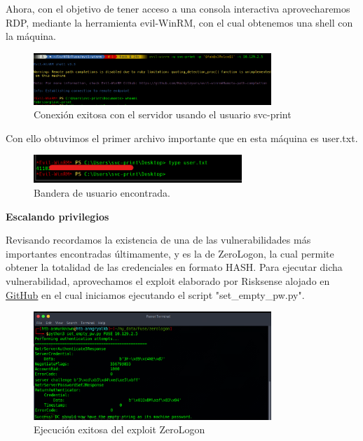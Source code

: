 \documentclass{article}
\begin{document}
Ahora, con el objetivo de tener acceso a una consola interactiva aprovecharemos RDP, mediante la herramienta evil-WinRM, con el cual obtenemos una shell con la máquina.

\begin{figure}[h]
	\center
	\includegraphics[width=0.8\textwidth]{images/fuse/image16.png}
	\caption{Conexión exitosa con el servidor usando el usuario svc-print}
\end{figure}

Con ello obtuvimos el primer archivo importante que en esta máquina es user.txt.

\begin{figure}[h]
	\center
	\includegraphics[width=0.7\textwidth]{images/fuse/image17.png}
	\caption{Bandera de usuario encontrada.}
\end{figure}
\vfill
\textbf{Escalando privilegios}

Revisando recordamos la existencia de una de las vulnerabilidades más importantes encontradas últimamente, y es la de ZeroLogon, la cual permite obtener la totalidad de las credenciales en formato HASH. 
Para ejecutar dicha vulnerabilidad, aprovechamos el exploit elaborado por Risksense alojado en \href{https://github.com/risksense/zerologon}{GitHub} en el cual iniciamos ejecutando el script "set\_empty\_pw.py". 

\begin{figure}[H]
	\center
	\includegraphics[width=0.8\textwidth]{images/fuse/image18.png}
	\caption{Ejecución exitosa del exploit ZeroLogon}
\end{figure}
\end{document}
